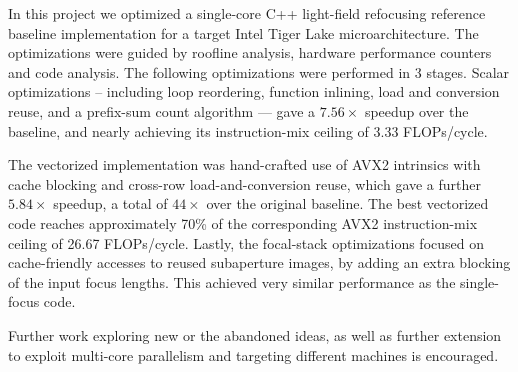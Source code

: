 \documentclass[letterpaper]{article}
\newcommand{\mypar}[1]{{\bf #1.}}
\begin{document}
In this project we optimized a single-core C++ light-field refocusing reference baseline implementation for a target Intel Tiger Lake microarchitecture. The optimizations were guided by roofline analysis, hardware performance counters and code analysis. The following optimizations were performed in 3 stages. Scalar optimizations -- including loop reordering, function inlining, load and conversion reuse, and a prefix-sum count algorithm --- gave a $7.56\times$ speedup over the baseline, and nearly achieving its instruction-mix ceiling of 3.33 FLOPs/cycle.

The vectorized implementation was hand-crafted use of AVX2 intrinsics with cache blocking and cross-row load-and-conversion reuse, which gave a further $5.84\times$ speedup, a total of $44\times$ over the original baseline. The best vectorized code reaches approximately 70\% of the corresponding AVX2 instruction-mix ceiling of 26.67 FLOPs/cycle. Lastly, the focal-stack optimizations focused on cache-friendly accesses to reused subaperture images, by adding an extra blocking of the input focus lengths. This achieved very similar performance as the single-focus code.

Further work exploring new or the abandoned ideas, as well as further extension to exploit multi-core parallelism and targeting different machines is encouraged. 








\end{document}
